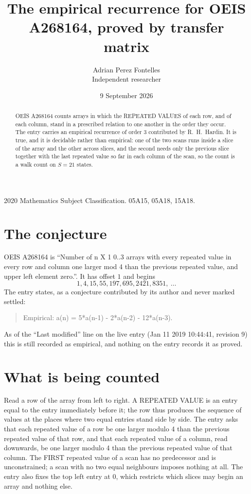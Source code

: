 \documentclass[11pt,a4paper]{article}
\title{The empirical recurrence for OEIS A268164, proved by transfer matrix}
\author{Adrian Perez Fontelles\\ \small Independent researcher}
\date{9 September 2026}
\theoremstyle{plain}
\theoremstyle{definition}
\begin{document}
\maketitle

\begin{abstract}
OEIS A268164 counts arrays in which the REPEATED VALUES of each row, and of each column, stand in a
prescribed relation to one another in the order they occur. The entry carries an empirical
recurrence of order $3$ contributed by R.~H.~Hardin. It is true, and it is decidable
rather than empirical: one of the two scans runs inside a slice of the array and the other
across slices, and the second needs only the previous slice together with the last repeated
value so far in each column of the scan, so the count is a walk count on $S=21$ states.
\end{abstract}

\noindent\small 2020 Mathematics Subject Classification. 05A15, 05A18, 15A18.\normalsize

\section{The conjecture}

OEIS A268164 is ``Number of n X 1 0..3 arrays with every repeated value in every row and column one larger mod 4 than the previous repeated value, and upper left element zero.''. It has offset $1$ and begins
\[
1, 4, 15, 55, 197, 695, 2421, 8351,\ \dots
\]
The entry states, as a conjecture contributed by its author and never marked settled:
\begin{quote}
Empirical: a(n) = 5*a(n-1) - 2*a(n-2) - 12*a(n-3).
\end{quote}
As of the ``Last modified'' line on the live entry (Jan 11 2019 10:44:41, revision 9) this is still
recorded as empirical, and nothing on the entry records it as proved.

\section{What is being counted}

Read a row of the array from left to right. A REPEATED VALUE is an entry equal to the entry
immediately before it; the row thus produces the sequence of values at the places where two
equal entries stand side by side. The entry asks that each repeated value of a row be
one larger modulo 4 than the previous repeated value of that row, and that each repeated value of a column,
read downwards, be one larger modulo 4 than the previous repeated value of that column. The FIRST repeated
value of a scan has no predecessor and is unconstrained; a scan with no two equal neighbours
imposes nothing at all. The entry also fixes the top left entry at $0$, which restricts which slices may begin an array and nothing else.
\end{document}
